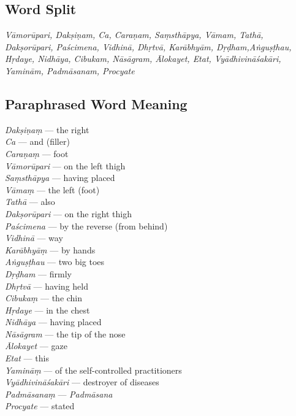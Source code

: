 \subsection*{Word Split}
\vspace{-10pt}

\textit{Vāmorūpari, Dakṣiṇam, Ca, Caraṇam, Saṃsthāpya, Vāmam, Tathā, Dakṣorūpari, Paścimena, Vidhinā, Dhṛtvā, Karābhyām, Dṛḍham,Aṅguṣṭhau, Hṛdaye, Nidhāya, Cibukam, Nāsāgram, Ālokayet, Etat, Vyādhivināśakāri, Yaminām, Padmāsanam, Procyate}
\vspace{-10pt}

\newpage
\subsection*{Paraphrased Word Meaning}
\vspace{-10pt}

\begin{multicols}{2}
\itemsep=0pt
\textit{Dakṣiṇaṃ} --- the right  \\
\textit{Ca} ---  and (filler)  \\
\textit{Caraṇaṃ} ---  foot  \\
\textit{Vāmorūpari} ---  on the left thigh  \\
\textit{Saṃsthāpya} ---  having placed  \\
\textit{Vāmaṃ} ---  the left (foot) \\
\textit{Tathā} ---  also \\
\textit{Dakṣorūpari} --- on the right thigh \\
\textit{Paścimena} ---  by the reverse (from behind)  \\
\textit{Vidhinā} ---  way \\
\textit{Karābhyāṃ} --- by hands \\
\textit{Aṅguṣṭhau} --- two big toes \\
\textit{Dṛḍham} --- firmly \\
\textit{Dhṛtvā} ---  having held  \\
\textit{Cibukaṃ} ---  the chin \\
\textit{Hṛdaye} ---  in the chest \\
\textit{Nidhāya} ---  having placed \\
\textit{Nāsāgram} --- the tip of the nose  \\
\textit{Ālokayet} ---  gaze \\
\textit{Etat} ---  this \\
\textit{Yamināṃ} ---  of the self-controlled practitioners \\
\textit{Vyādhivināśakāri} ---  destroyer of diseases \\
\textit{Padmāsanaṃ} ---  \textit{Padmāsana} \\
\textit{Procyate} --- stated
\end{multicols}

